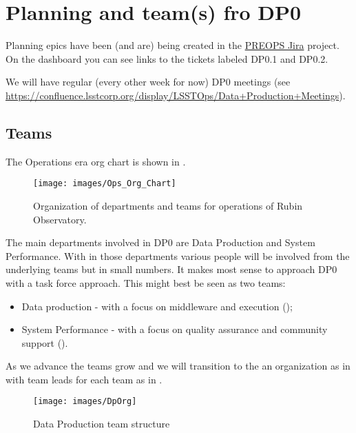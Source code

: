 \section{Planning and team(s) fro DP0} \label{sec:plan}

Planning epics have been (and are) being created in the \href{https://jira.lsstcorp.org/secure/Dashboard.jspa?selectPageId=15608}{PREOPS Jira} project.
On the dashboard you can see links to the  tickets labeled DP0.1 and DP0.2.

We will have regular (every other week for now) DP0 meetings (see \url{https://confluence.lsstcorp.org/display/LSSTOps/Data+Production+Meetings}).

\subsection {Teams}

The Operations era org chart is shown in .


\begin{figure}
\begin{center}
\texttt{[image: images/Ops\_Org\_Chart]}
\end{center}
\caption{ Organization of departments and teams  for operations of Rubin Observatory. \label{fig:org}}
\end{figure}

The main departments involved in DP0 are Data Production and System Performance. With in those departments various people will be involved from the underlying teams but in small numbers. It makes most sense to approach DP0 with a task force approach. This might best be seen as two teams:

\begin{itemize}
\item Data production - with a focus on middleware and execution ();
\item System Performance - with a focus on quality assurance and community support ().
\end{itemize}

As we advance the teams grow and we will transition to the an organization as in 
with team leads for each team as in .


\begin{figure}
\begin{center}
\texttt{[image: images/DpOrg]}
\end{center}
\caption{Data Production team structure \label{fig:dporg}}
\end{figure}

